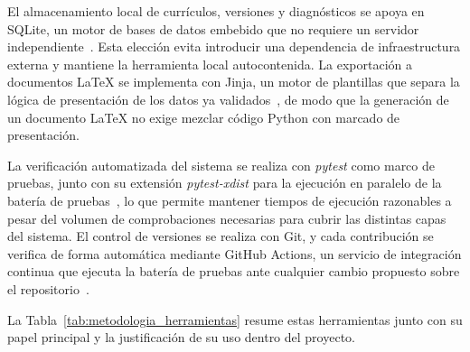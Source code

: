 El almacenamiento local de currículos, versiones y diagnósticos se apoya en
SQLite, un motor de bases de datos embebido que no requiere un servidor
independiente~\cite{sqlite_docs}. Esta elección evita introducir una
dependencia de infraestructura externa y mantiene la herramienta local
autocontenida. La exportación a documentos LaTeX se implementa con Jinja, un
motor de plantillas que separa la lógica de presentación de los datos ya
validados~\cite{jinja_docs}, de modo que la generación de un documento LaTeX no
exige mezclar código Python con marcado de presentación.

La verificación automatizada del sistema se realiza con \textit{pytest} como
marco de pruebas, junto con su extensión \textit{pytest-xdist} para la
ejecución en paralelo de la batería de pruebas~\cite{pytest_docs}, lo que
permite mantener tiempos de ejecución razonables a pesar del volumen de
comprobaciones necesarias para cubrir las distintas capas del sistema. El
control de versiones se realiza con Git, y cada contribución se verifica de
forma automática mediante GitHub Actions, un servicio de integración continua
que ejecuta la batería de pruebas ante cualquier cambio propuesto sobre el
repositorio~\cite{github_actions_docs}.

La Tabla~\ref{tab:metodologia_herramientas} resume estas herramientas junto con
su papel principal y la justificación de su uso dentro del proyecto.

